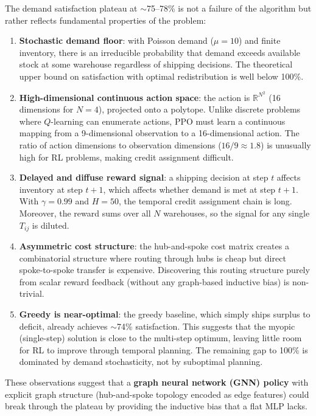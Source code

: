 \documentclass[11pt]{article}
\begin{document}
The demand satisfaction plateau at $\sim$75--78\% is not a failure of the algorithm but rather reflects fundamental properties of the problem:

\begin{enumerate}
    \item \textbf{Stochastic demand floor}: with Poisson demand ($\mu=10$) and finite inventory, there is an irreducible probability that demand exceeds available stock at some warehouse regardless of shipping decisions. The theoretical upper bound on satisfaction with optimal redistribution is well below 100\%.

    \item \textbf{High-dimensional continuous action space}: the action is $\mathbb{R}^{N^2}$ (16 dimensions for $N=4$), projected onto a polytope. Unlike discrete problems where $Q$-learning can enumerate actions, PPO must learn a continuous mapping from a 9-dimensional observation to a 16-dimensional action. The ratio of action dimensions to observation dimensions ($16/9 \approx 1.8$) is unusually high for RL problems, making credit assignment difficult.

    \item \textbf{Delayed and diffuse reward signal}: a shipping decision at step $t$ affects inventory at step $t{+}1$, which affects whether demand is met at step $t{+}1$. With $\gamma = 0.99$ and $H=50$, the temporal credit assignment chain is long. Moreover, the reward sums over all $N$ warehouses, so the signal for any single $T_{ij}$ is diluted.

    \item \textbf{Asymmetric cost structure}: the hub-and-spoke cost matrix creates a combinatorial structure where routing through hubs is cheap but direct spoke-to-spoke transfer is expensive. Discovering this routing structure purely from scalar reward feedback (without any graph-based inductive bias) is non-trivial.

    \item \textbf{Greedy is near-optimal}: the greedy baseline, which simply ships surplus to deficit, already achieves $\sim$74\% satisfaction. This suggests that the myopic (single-step) solution is close to the multi-step optimum, leaving little room for RL to improve through temporal planning. The remaining gap to 100\% is dominated by demand stochasticity, not by suboptimal planning.
\end{enumerate}

These observations suggest that a \textbf{graph neural network (GNN) policy} with explicit graph structure (hub-and-spoke topology encoded as edge features) could break through the plateau by providing the inductive bias that a flat MLP lacks.
\end{document}
